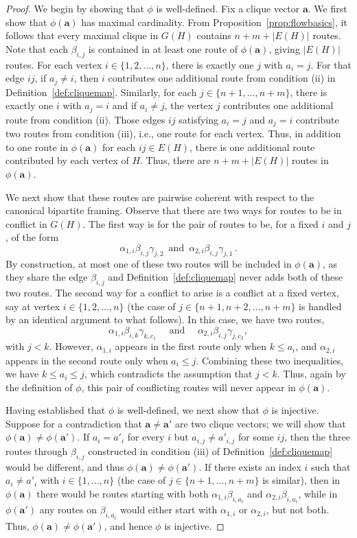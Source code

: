 \documentclass[12pt]{amsart}
\theoremstyle{definition}
\newcommand\ba{\mathbf{a}}
\begin{document}
\begin{proof}
We begin by showing that $\phi$ is well-defined.
Fix a clique vector $\ba$.
We first show that $\phi(\ba)$ has maximal cardinality.
From Proposition~\ref{prop:flowbasics}, it follows that every maximal clique in $G(H)$ contains $n+m+|E(H)|$ routes.
Note that each $\beta_{i,j}$ is contained in at least one route of $\phi(\ba)$, giving $|E(H)|$ routes.
For each vertex $i\in\{1,2,\ldots,n\}$, there is exactly one $j$ with $a_i=j$.
For that edge $ij$, if $a_j\neq i$, then $i$ contributes one additional route from condition (ii) in Definition~\ref{def:cliquemap}.
Similarly, for each $j\in \{n+1,\ldots,n+m\}$, there is exactly one $i$ with $a_j=i$ and if $a_i\neq j$, the vertex $j$ contributes one additional route from condition (ii).
Those edges $ij$ satisfying $a_i=j$ and $a_j=i$ contribute two routes from condition (iii), i.e., one route for each vertex.
Thus, in addition to one route in $\phi(\ba)$ for each $ij\in E(H)$, there is one additional route contributed by each vertex of $H$.
Thus, there are $n+m+|E(H)|$ routes in $\phi(\ba)$.

We next show that these routes are pairwise coherent with respect to the canonical bipartite framing.
Observe that there are two ways for routes to be in conflict in $G(H)$.
The first way is for the pair of routes to be, for a fixed $i$ and $j$, of the form
\[
\alpha_{1,i}\beta_{i,j}\gamma_{j,2}\,
\text{  and  }\,
\alpha_{2,i}\beta_{i,j}\gamma_{j,1} \, .
\]
By construction, at most one of these two routes will be included in $\phi(\ba)$, as they share the edge $\beta_{i,j}$ and Definition~\ref{def:cliquemap} never adds both of these two routes.
The second way for a conflict to arise is a conflict at a fixed vertex, say at vertex $i\in \{1,2,\ldots,n\}$ (the case of $j\in \{n+1,n+2,\ldots,n+m\}$ is handled by an identical argument to what follows).
In this case, we have two routes,
\[
\alpha_{1,i}\beta_{i,k}\gamma_{k,c_1} \quad \text{ and } \quad 
\alpha_{2,i}\beta_{i,j}\gamma_{j,c_2},
\]
with $j<k$.
However, $\alpha_{1,i}$ appears in the first route only when $k\leq a_i$, and $\alpha_{2,i}$ appears in the second route only when $a_i\leq j$.
Combining these two inequalities, we have $k\leq a_i\leq j$, which contradicts the assumption that $j<k$.
Thus, again by the definition of $\phi$, this pair of conflicting routes will never appear in $\phi(\ba)$.

Having established that $\phi$ is well-defined, we next show that $\phi$ is injective.
Suppose for a contradiction that $\ba\neq \ba'$ are two clique vectors; we will show that $\phi(\ba)\neq \phi(\ba')$.
If $a_i=a'_i$ for every $i$ but $a_{i,j}\neq a'_{i,j}$ for some $ij$, then the three routes through $\beta_{i,j}$ constructed in condition (iii) of Definition~\ref{def:cliquemap} would be different, and thus $\phi(\ba)\neq \phi(\ba')$.
If there exists an index $i$ such that $a_i\neq a'_i$ with $i\in \{1,\ldots,n\}$ (the case of $j\in \{n+1,\ldots,n+m\}$ is similar), then in $\phi(\ba)$ there would be routes starting with both $\alpha_{1,i}\beta_{i,a_i}$ and $\alpha_{2,i}\beta_{i,a_i}$, while in $\phi(\ba')$ any routes on $\beta_{i,a_i}$ would either start with $\alpha_{1,i}$ or $\alpha_{2,i}$, but not both.
Thus, $\phi(\ba)\neq \phi(\ba')$, and hence $\phi$ is injective.


\end{proof}
\end{document}
